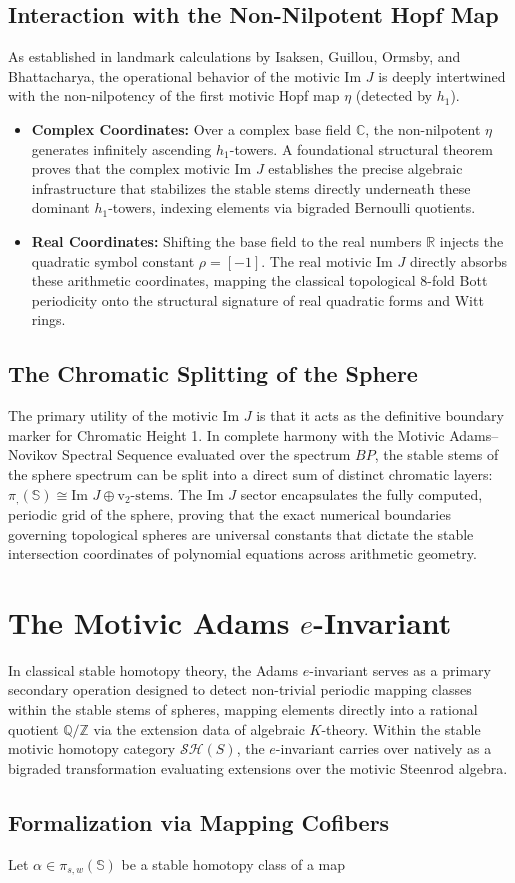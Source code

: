 \documentclass[11pt,oneside]{article}
\begin{document}
\subsection{Interaction with the Non-Nilpotent Hopf Map}As established in landmark calculations by Isaksen, Guillou, Ormsby, and Bhattacharya, the operational behavior of the motivic $\text{Im } J$ is deeply intertwined with the non-nilpotency of the first motivic Hopf map $\eta$ (detected by $h_1$).\begin{itemize}\item \textbf{Complex Coordinates:} Over a complex base field $\mathbb{C}$, the non-nilpotent $\eta$ generates infinitely ascending $h_1$-towers. A foundational structural theorem proves that the complex motivic $\text{Im } J$ establishes the precise algebraic infrastructure that stabilizes the stable stems directly underneath these dominant $h_1$-towers, indexing elements via bigraded Bernoulli quotients.\item \textbf{Real Coordinates:} Shifting the base field to the real numbers $\mathbb{R}$ injects the quadratic symbol constant $\rho = [-1]$. The real motivic $\text{Im } J$ directly absorbs these arithmetic coordinates, mapping the classical topological 8-fold Bott periodicity onto the structural signature of real quadratic forms and Witt rings.\end{itemize}\subsection{The Chromatic Splitting of the Sphere}The primary utility of the motivic $\text{Im } J$ is that it acts as the definitive boundary marker for Chromatic Height 1. In complete harmony with the Motivic Adams--Novikov Spectral Sequence evaluated over the spectrum $BP$, the stable stems of the sphere spectrum can be split into a direct sum of distinct chromatic layers: $\pi_{,}(\mathbb{S}) \cong \text{Im } J \oplus \text{v}_2\text{-stems}$. The $\text{Im } J$ sector encapsulates the fully computed, periodic grid of the sphere, proving that the exact numerical boundaries governing topological spheres are universal constants that dictate the stable intersection coordinates of polynomial equations across arithmetic geometry.\section{The Motivic Adams $e$-Invariant}In classical stable homotopy theory, the Adams $e$-invariant serves as a primary secondary operation designed to detect non-trivial periodic mapping classes within the stable stems of spheres, mapping elements directly into a rational quotient $\mathbb{Q}/\mathbb{Z}$ via the extension data of algebraic $K$-theory. Within the stable motivic homotopy category $\mathcal{S}\mathcal{H}(S)$, the $e$-invariant carries over natively as a bigraded transformation evaluating extensions over the motivic Steenrod algebra.\subsection{Formalization via Mapping Cofibers}Let $\alpha \in \pi_{s,w}(\mathbb{S})$ be a stable homotopy class of a map 
\end{document}
